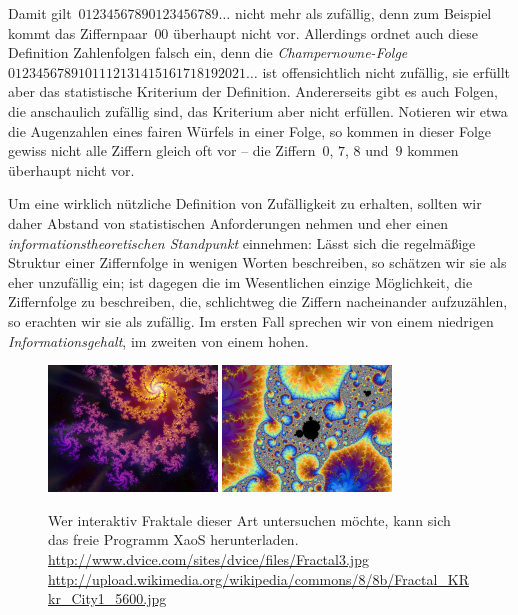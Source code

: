 \documentclass[twoside]{../zirkelblatt1415}
\theoremstyle{definition}
\theoremstyle{plain}
\theoremstyle{remark}
\begin{document}
Damit gilt~$01234567890123456789\ldots$ nicht mehr als zufällig, denn zum
Beispiel kommt das Ziffernpaar~$00$ überhaupt nicht vor. Allerdings ordnet auch
diese Definition Zahlenfolgen falsch ein, denn die \emph{Champernowne-Folge}
$0123456789101112131415161718192021\ldots$ ist offensichtlich nicht zufällig,
sie erfüllt aber das statistische Kriterium der Definition. Andererseits gibt
es auch Folgen, die anschaulich zufällig sind, das Kriterium aber nicht
erfüllen. Notieren wir etwa die Augenzahlen eines fairen Würfels in einer
Folge, so kommen in dieser Folge gewiss nicht alle Ziffern gleich oft vor --
die Ziffern~$0$, $7$, $8$ und~$9$ kommen überhaupt nicht vor.

Um eine wirklich nützliche Definition von Zufälligkeit zu erhalten, sollten wir
daher Abstand von statistischen Anforderungen nehmen und eher einen
\emph{informationstheoretischen Standpunkt} einnehmen: Lässt sich die
regelmäßige Struktur einer Ziffernfolge in wenigen Worten beschreiben, so
schätzen wir sie als eher unzufällig ein; ist dagegen die im Wesentlichen einzige Möglichkeit,
die Ziffernfolge zu beschreiben, die, schlichtweg die Ziffern nacheinander
aufzuzählen, so erachten wir sie als zufällig. Im ersten Fall sprechen wir von
einem niedrigen \emph{Informationsgehalt}, im zweiten von einem hohen.

\begin{figure}[b]
  \hfill
  \includegraphics[width=0.4\textwidth]{fraktal1}\hfill
  \includegraphics[width=0.4\textwidth]{fraktal2}\hfill
  \centering
  \caption{\label{fig:fraktale}Wer interaktiv Fraktale dieser Art
  untersuchen möchte, kann sich das freie Programm XaoS herunterladen. \newline
  {\tiny
  \url{http://www.dvice.com/sites/dvice/files/Fractal3.jpg}
  \url{http://upload.wikimedia.org/wikipedia/commons/8/8b/Fractal_KRkr_City1_5600.jpg}}}
\end{figure}
\end{document}
